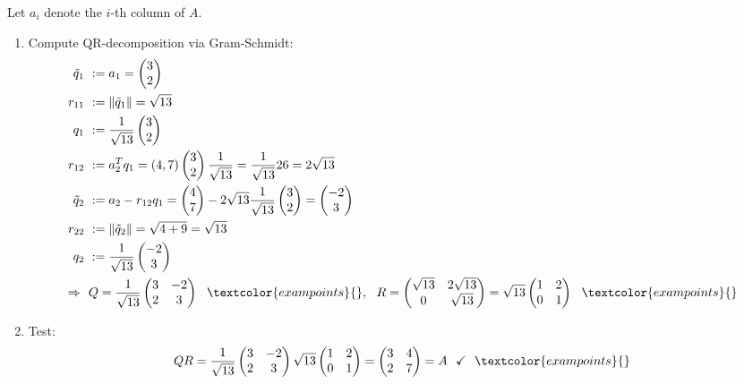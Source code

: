 {\color{solution}
Let $a_i$ denote the $i$-th column of $A$.
\begin{enumerate}
	\item 
	Compute QR-decomposition via Gram-Schmidt:
	\begin{align*}
	\tilde{q}_1~&:=a_1 =\begin{pmatrix}3\\2\end{pmatrix}\\
	r_{11}~&:=\|\tilde{q}_1\|=\sqrt{13}\\
	q_1~&:=\frac{1}{\sqrt{13}}\begin{pmatrix}3\\2\end{pmatrix}\\
	r_{12}~&:=a_2^Tq_1 = (4,7)\begin{pmatrix}3\\2\end{pmatrix}\frac{1}{\sqrt{13}}=\frac{1}{\sqrt{13}}26=2\sqrt{13}\\
	\tilde{q}_2~&:=a_2-r_{12}q_1=\begin{pmatrix}4\\7\end{pmatrix}-2\sqrt{13}\frac{1}{\sqrt{13}}\begin{pmatrix}3\\2\end{pmatrix}=\begin{pmatrix}-2\\3\end{pmatrix}\\
	r_{22}~&:=\|\tilde{q}_2\|=\sqrt{4+9}=\sqrt{13}\\
	q_2~&:=\frac{1}{\sqrt{13}}\begin{pmatrix}-2\\3\end{pmatrix}\\
	\Rightarrow~~&
	Q=\frac{1}{\sqrt{13}}\begin{pmatrix}3&-2\\2&3\end{pmatrix}~~\textcolor{exampoints}{},~~
	R=\begin{pmatrix}\sqrt{13}&2\sqrt{13}\\0&\sqrt{13}\end{pmatrix}=\sqrt{13}\begin{pmatrix}1&2\\0&1\end{pmatrix}~~\textcolor{exampoints}{}
	\end{align*}
	\item Test:$$QR=\frac{1}{\sqrt{13}}\begin{pmatrix}3&-2\\2&3\end{pmatrix}\sqrt{13}\begin{pmatrix}1&2\\0&1\end{pmatrix}=\begin{pmatrix}3&4\\2&7\end{pmatrix}=A~~\checkmark~~\textcolor{exampoints}{}$$
\end{enumerate}
}